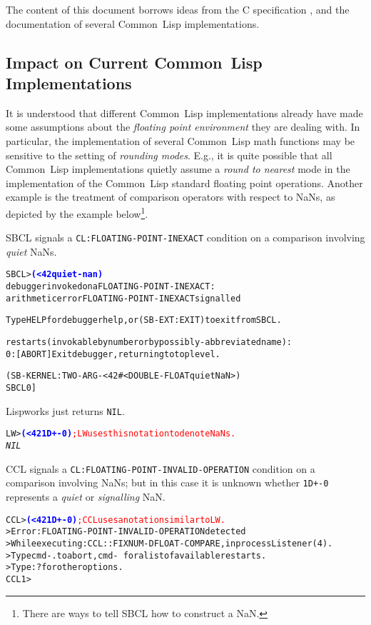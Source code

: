 \documentclass[10pt,fleqn]{article}
\newcommand{\CL}{\textsf{Common~Lisp}}
\newcommand{\CLang}{\textsf{C}}
\newcommand{\code}[1]{\texttt{#1}}
\newcommand{\codeprompt}[1]{\textcolor{blue}{\textbf{#1}}}
\begin{document}
The content of this document borrows ideas from the \CLang{}
specification \cite{2018:C18}, and the documentation of
several \CL{} implementations.


\subsection{Impact on Current \CL{} Implementations}

It is understood that different \CL{} implementations already have
made some assumptions about the \emph{floating point environment} they
are dealing with.  In particular, the implementation of several \CL{}
math functions may be sensitive to the
setting of \emph{rounding modes}.  E.g., it is quite possible that all
\CL{} implementations quietly assume a \emph{round to nearest} mode in
the implementation of the \CL{} standard floating point operations.
Another example is the treatment of comparison operators with respect
to NaNs, as depicted by the example below\footnote{There are ways to
  tell SBCL how to construct a NaN.}.

\vspace*{3mm}

\noindent
SBCL signals a \code{CL:FLOATING-POINT-INEXACT} condition on a
comparison involving \emph{quiet} NaNs.
\begin{alltt}
SBCL> \codeprompt{(< 42 quiet-nan)}
debugger invoked on a FLOATING-POINT-INEXACT:
  arithmetic error FLOATING-POINT-INEXACT signalled

Type HELP for debugger help, or (SB-EXT:EXIT) to exit from SBCL.

restarts (invokable by number or by possibly-abbreviated name):
  0: [ABORT] Exit debugger, returning to top level.

(SB-KERNEL:TWO-ARG-< 42 #<DOUBLE-FLOAT quiet NaN>)
SBCL 0]
\end{alltt}

\vspace*{3mm}

\noindent
Lispworks just returns \code{NIL}.
\begin{alltt}
LW> \codeprompt{(< 42 1D+-0)} \textcolor{red}{; LW uses this notation to denote NaNs.}
\textit{NIL}
\end{alltt}

\vspace*{3mm}

\noindent
CCL signals a \code{CL:FLOATING-POINT-INVALID-OPERATION} condition on a
comparison involving NaNs; but in this case it is unknown whether
\code{1D+-0} represents a \emph{quiet} or \emph{signalling} NaN.
\begin{alltt}
CCL> \codeprompt{(< 42 1D+-0)} \textcolor{red}{; CCL uses a notation similar to LW.}
> Error: FLOATING-POINT-INVALID-OPERATION detected
> While executing: CCL::FIXNUM-DFLOAT-COMPARE, in process Listener(4).
> Type cmd-. to abort, cmd-\ for a list of available restarts.
> Type :? for other options.
CCL 1 > 
\end{alltt}
\end{document}
